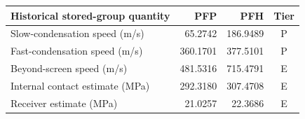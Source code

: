 \begin{longtable}{p{.38\linewidth}rrc}\toprule
Historical stored-group quantity & PFP & PFH & Tier\\\midrule\endhead
Slow-condensation speed (m/s) & 65.2742 & 186.9489 & P\\
Fast-condensation speed (m/s) & 360.1701 & 377.5101 & P\\
Beyond-screen speed (m/s) & 481.5316 & 715.4791 & E\\
Internal contact estimate (MPa) & 292.3180 & 307.4708 & E\\
Receiver estimate (MPa) & 21.0257 & 22.3686 & E\\
\bottomrule\end{longtable}
